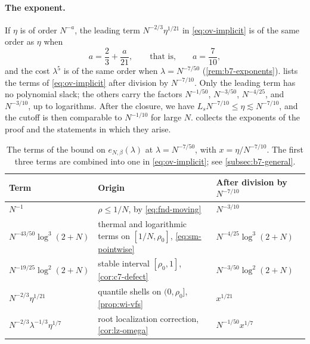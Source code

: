 \paragraph{The exponent.}
If $\eta$ is of order $N^{-a}$, the leading term
$N^{-2/3}\eta^{1/21}$ in \eqref{eq:ov-implicit} is of the same order as
$\eta$ when
\[
 a=\frac23+\frac a{21},\qquad\text{that is,}\qquad a=\frac7{10},
\]
and the cost $\lambda^5$ is of the same order when $\lambda=N^{-7/50}$
(\cref{rem:b7-exponents}).  lists the terms of
\eqref{eq:ov-implicit} after division by $N^{-7/10}$. Only the leading
term has no polynomial slack; the others carry the factors $N^{-1/50}$,
$N^{-3/50}$, $N^{-4/25}$, and $N^{-3/10}$, up to logarithms. After the
closure, we have $L_sN^{-7/10}\le\eta\lesssim N^{-7/10}$, and the
cutoff is then comparable to $N^{-1/10}$ for large $N$.
 collects the exponents of the proof and
the statements in which they arise.

\begin{table}[!tb]
\centering
\small
\begin{tabular}{@{}>{\raggedright\arraybackslash}p{}
 >{\raggedright\arraybackslash}p{}
 >{\raggedright\arraybackslash}p{}@{}}
\toprule
Term & Origin & After division by $N^{-7/10}$\\
\midrule
$N^{-1}$ & $\rho\le1/N$, by \eqref{eq:fnd-moving} & $N^{-3/10}$\\
$N^{-43/50}\log^3(2+N)$ & thermal and logarithmic terms on
 $[1/N,\rho_0]$, \eqref{eq:sm-pointwise} & $N^{-4/25}\log^3(2+N)$\\
$N^{-19/25}\log^2(2+N)$ & stable interval $[\rho_0,1]$,
 \cref{cor:c7-defect} & $N^{-3/50}\log^2(2+N)$\\
$N^{-2/3}\eta^{1/21}$ & quantile shells on $(0,\rho_0]$,
 \cref{prop:wi-vfs} & $x^{1/21}$\\
$N^{-2/3}\lambda^{-1/3}\eta^{1/7}$ & root localization correction,
 \cref{cor:lz-omega} & $N^{-1/50}x^{1/7}$\\
\bottomrule
\end{tabular}
\caption{The terms of the bound on $e_{N,\beta}(\lambda)$ at
$\lambda=N^{-7/50}$, with $x=\eta/N^{-7/10}$. The first three terms are
combined into one in \eqref{eq:ov-implicit}; see
\cref{subsec:b7-general}.}
\label{tab:overview-terms}
\end{table}

